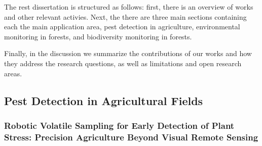 The rest dissertation is structured as follows: first, there is an overview of works and other relevant activies. Next, the there are three main sections containing each the main application area, pest detection in agriculture, environmental monitoring in forests, and biodiversity monitoring in forests. 

Finally, in the discussion we summarize the contributions of our works and how they address the research questions, as well as limitations and open research areas. 



\subsection{Pest Detection in Agricultural Fields}


\subsubsection{Robotic Volatile Sampling for Early Detection of Plant Stress: Precision Agriculture Beyond Visual Remote Sensing \cite{Geckeler2023a}}


